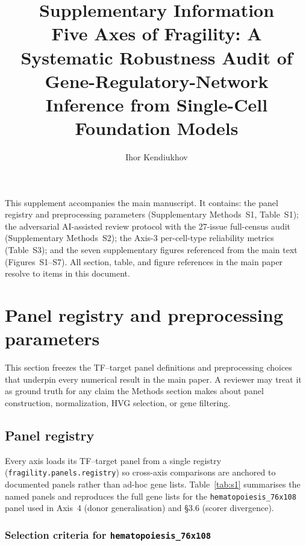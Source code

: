 \documentclass[a4paper,11pt]{article}
\title{\textbf{Supplementary Information}\\[6pt]
\large Five Axes of Fragility: A Systematic Robustness Audit of\\
Gene-Regulatory-Network Inference from Single-Cell Foundation Models}
\author{Ihor Kendiukhov}
\date{}
\begin{document}
\maketitle
\thispagestyle{fancy}

\tableofcontents
\listoffigures
\listoftables

\vspace{1em}
\noindent\hrulefill

\noindent
This supplement accompanies the main manuscript. It contains:
the panel registry and preprocessing parameters
(Supplementary Methods~S1, Table~S1); the adversarial AI-assisted
review protocol with the 27-issue full-census audit
(Supplementary Methods~S2); the Axis-3 per-cell-type reliability
metrics (Table~S3); and the seven supplementary figures referenced
from the main text (Figures~S1--S7). All section, table, and figure
references in the main paper resolve to items in this document.

\clearpage
\section{Panel registry and preprocessing parameters}
\label{sec:supp_methods_s1}

This section freezes the TF--target panel definitions and preprocessing
choices that underpin every numerical result in the main paper. A
reviewer may treat it as ground truth for any claim the Methods
section makes about panel construction, normalization, HVG selection,
or gene filtering.

\subsection{Panel registry}

Every axis loads its TF--target panel from a single registry
(\texttt{fragility.panels.registry}) so cross-axis comparisons are
anchored to documented panels rather than ad-hoc gene lists.
Table~\ref{tab:s1} summarises the named panels and reproduces the full
gene lists for the \texttt{hematopoiesis\_76x108} panel used in Axis~4
(donor generalisation) and \S3.6 (scorer divergence).

\subsubsection*{Selection criteria for \texttt{hematopoiesis\_76x108}}
\end{document}
